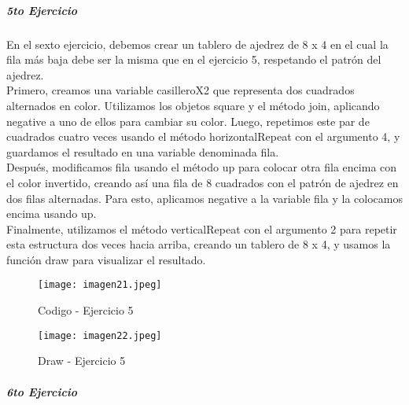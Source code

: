 \documentclass[10pt, a4paper]{article}
\begin{document}
	\subparagraph*{5to Ejercicio}
		\begin{flushleft}
			En el sexto ejercicio, debemos crear un tablero de ajedrez de 8 x 4 en el cual la fila más baja debe ser la misma que en el ejercicio 5, respetando el patrón del ajedrez.\\
			Primero, creamos una variable casilleroX2 que representa dos cuadrados alternados en color. Utilizamos los objetos square y el método join, aplicando negative a uno de ellos para cambiar su color. Luego, repetimos este par de cuadrados cuatro veces usando el método horizontalRepeat con el argumento 4, y guardamos el resultado en una variable denominada fila.\\
			Después, modificamos fila usando el método up para colocar otra fila encima con el color invertido, creando así una fila de 8 cuadrados con el patrón de ajedrez en dos filas alternadas. Para esto, aplicamos negative a la variable fila y la colocamos encima usando up.\\			
			Finalmente, utilizamos el método verticalRepeat con el argumento 2 para repetir esta estructura dos veces hacia arriba, creando un tablero de 8 x 4, y usamos la función draw para visualizar el resultado.
		\end{flushleft}
		\begin{figure}[h]
			\centering
			\texttt{[image: imagen21.jpeg]}
			\caption{Codigo - Ejercicio 5}
		\end{figure}
		\begin{figure}[h]
			\centering
			\texttt{[image: imagen22.jpeg]}
			\caption{Draw - Ejercicio 5}
		\end{figure} 
	\subparagraph*{6to Ejercicio}
\end{document}
